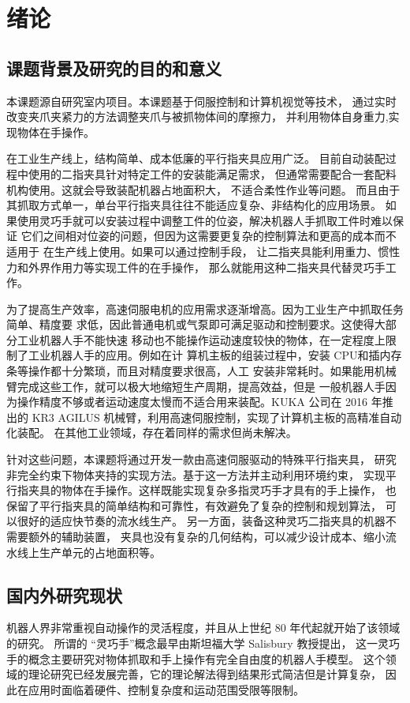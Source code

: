 \chapter{绪论}

\section{课题背景及研究的目的和意义}
本课题源自研究室内项目。本课题基于伺服控制和计算机视觉等技术，
通过实时改变夹爪夹紧力的方法调整夹爪与被抓物体间的摩擦力，
并利用物体自身重力,实现物体在手操作。

在工业生产线上，结构简单、成本低廉的平行指夹具应用广泛。
目前自动装配过程中使用的二指夹具针对特定工件的安装能满足需求，
但通常需要配合一套配料机构使用。这就会导致装配机器占地面积大，
不适合柔性作业等问题。
而且由于其抓取方式单一，单台平行指夹具往往不能适应复杂、非结构化的应用场景。
如果使用灵巧手就可以安装过程中调整工件的位姿，解决机器人手抓取工件时难以保证
它们之间相对位姿的问题，但因为这需要更复杂的控制算法和更高的成本而不适用于
在生产线上使用。如果可以通过控制手段，
让二指夹具能利用重力、惯性力和外界作用力等实现工件的在手操作，
那么就能用这种二指夹具代替灵巧手工作。

为了提高生产效率，高速伺服电机的应用需求逐渐增高。因为工业生产中抓取任务简单、精度要
求低，因此普通电机或气泵即可满足驱动和控制要求。这使得大部分工业机器人手不能快速
移动也不能操作运动速度较快的物体，在一定程度上限制了工业机器人手的应用。例如在计
算机主板的组装过程中，安装 CPU和插内存条等操作都十分繁琐，而且对精度要求很高，人工
安装非常耗时。如果能用机械臂完成这些工作，就可以极大地缩短生产周期，提高效益，但是
一般机器人手因为操作精度不够或者运动速度太慢而不适合用来装配。KUKA 公司在 2016
年推出的 KR3 AGILUS 机械臂，利用高速伺服控制，实现了计算机主板的高精准自动化装配。
在其他工业领域，存在着同样的需求但尚未解决。

针对这些问题，本课题将通过开发一款由高速伺服驱动的特殊平行指夹具，
研究非完全约束下物体夹持的实现方法。基于这一方法并主动利用环境约束，
实现平行指夹具的物体在手操作。这样既能实现复杂多指灵巧手才具有的手上操作，
也保留了平行指夹具的简单结构和可靠性，有效避免了复杂的控制和规划算法，
可以很好的适应快节奏的流水线生产。
另一方面，装备这种灵巧二指夹具的机器不需要额外的辅助装置，
夹具也没有复杂的几何结构，可以减少设计成本、缩小流水线上生产单元的占地面积等。

\section{国内外研究现状}
机器人界非常重视自动操作的灵活程度，并且从上世纪 80 年代起就开始了该领域的研究。
所谓的 “灵巧手”概念最早由斯坦福大学 Salisbury 教授提出，
这一灵巧手的概念主要研究对物体抓取和手上操作有完全自由度的机器人手模型。
这个领域的理论研究已经发展完善，它的理论解法得到结果形式简洁但是计算复杂，
因此在应用时面临着硬件、控制复杂度和运动范围受限等限制\cite{ref1}。

